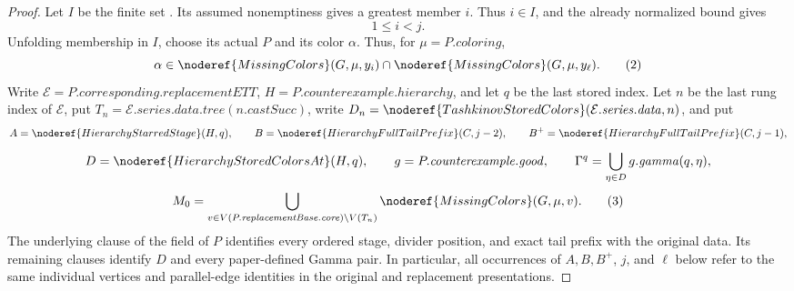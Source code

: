 \begin{proof}
Let \(I\) be the finite set
.  Its assumed
nonemptiness gives a greatest member \(i\).  Thus \(i\in I\), and the
already normalized bound
 gives
\[
                         1\leq i<j.                           \tag{1}
\]
Unfolding membership in \(I\), choose its actual
 \(P\) and its color
\(\alpha\).  Thus, for \(\mu=P.\mathit{coloring}\),
\[
 \alpha\in\noderef{MissingColors}(G,\mu,y_i)\cap
              \noderef{MissingColors}(G,\mu,y_\ell).          \tag{2}
\]
Write \(\mathcal E=P.\mathit{corresponding}.\mathit{replacementETT}\),
\(H=P.\mathit{counterexample}.\mathit{hierarchy}\), and let \(q\) be the
last stored index.  Let \(n\) be the last rung index of \(\mathcal E\),
put \(T_n=\mathcal E.\mathit{series}.\mathit{data}.
                 \mathit{tree}(n.\mathit{castSucc})\),
write \(D_n=\noderef{TashkinovStoredColors}
(\mathcal E.\mathit{series}.\mathit{data},n)\), and put
\[
 A=\noderef{HierarchyStarredStage}(H,q),\qquad
 B=\noderef{HierarchyFullTailPrefix}(C,j-2),\qquad
 B^+=\noderef{HierarchyFullTailPrefix}(C,j-1),
\]
\[
 D=\noderef{HierarchyStoredColorsAt}(H,q),\qquad
 g=P.\mathit{counterexample}.\mathit{good},\qquad
 \Gamma^q=\bigcup_{\eta\in D}g.\mathit{gamma}(q,\eta),
\]
\[
 M_0=\bigcup_{v\in V(P.\mathit{replacementBase}.\mathit{core})
                         \setminus V(T_n)}
                 \noderef{MissingColors}(G,\mu,v).            \tag{3}
\]
The underlying  clause of the
 field of \(P\) identifies every ordered
stage, divider position, and exact tail prefix with the original data.
Its remaining clauses identify \(D\) and every paper-defined Gamma pair.
In particular, all occurrences of \(A,B,B^+\), \(j\), and \(\ell\) below
refer to the same individual vertices and parallel-edge identities in
the original and replacement presentations.


\end{proof}
